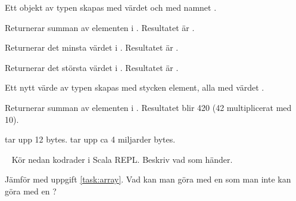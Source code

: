 \SubtaskSolved  Ett objekt av typen  skapas med värdet  och med namnet .

\SubtaskSolved  Returnerar summan av elementen i . Resultatet är .

\SubtaskSolved  Returnerar det minsta värdet i . Resultatet är .

\SubtaskSolved  Returnerar det största värdet i . Resultatet är .

\SubtaskSolved  Ett nytt värde av typen  skapas med  stycken element, alla med värdet .

\SubtaskSolved  Returnerar summan av elementen i . Resultatet blir 420 (42 multiplicerat med 10).

\SubtaskSolved  {} tar upp 12 bytes.  tar upp ca 4 miljarder bytes.



\QUESTEND









\QUESTBEGIN

\Task  \what~  Kör nedan kodrader i Scala REPL. Beskriv vad som händer.

\Subtask {}

\Subtask {}

\Subtask {}

\Subtask {}

\Subtask {}

\Subtask {}

\Subtask {}

\Subtask {}

\Subtask {}

\Subtask {}

\Subtask {}

\Subtask {}

\Subtask {}

\Subtask {}

\Subtask\Pen Jämför med uppgift \ref{task:array}. Vad kan man göra med en  som man inte kan göra med en ?

